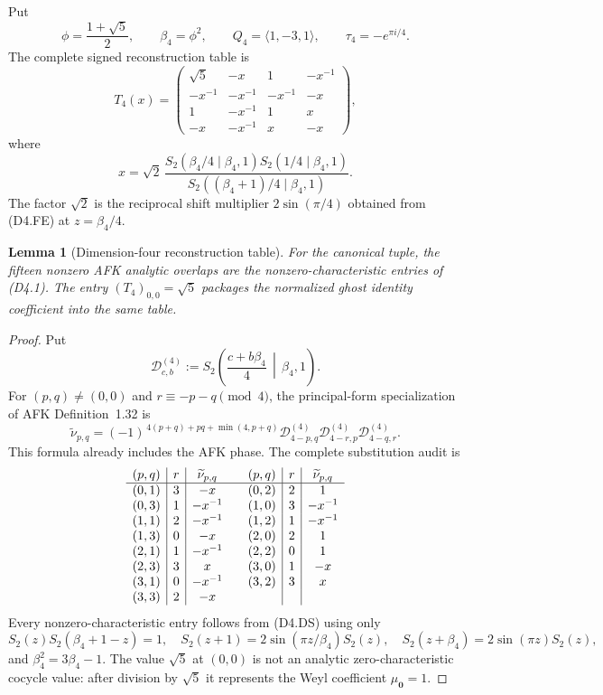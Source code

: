 \documentclass[11pt]{article}
\newtheorem{lemma}[theorem]{Lemma}
\begin{document}
Put
\[
 \phi=\frac{1+\sqrt5}{2},\qquad
 \beta_4=\phi^2,\qquad
 Q_4=\langle1,-3,1\rangle,\qquad
 \tau_4=-e^{\pi i/4}.
\]
The complete signed reconstruction table is
\[
T_4(x)=
\begin{pmatrix}
\sqrt5&-x&1&-x^{-1}\\
-x^{-1}&-x^{-1}&-x^{-1}&-x\\
1&-x^{-1}&1&x\\
-x&-x^{-1}&x&-x
\end{pmatrix},
\tag{D4.1}
\]
where
\[
x=\sqrt2\,
\frac{S_2(\beta_4/4\mid\beta_4,1)
      S_2(1/4\mid\beta_4,1)}
     {S_2((\beta_4+1)/4\mid\beta_4,1)}.
\tag{D4.2}
\]
The factor $\sqrt2$ is the reciprocal shift multiplier
$2\sin(\pi/4)$ obtained from \textup{(D4.FE)} at $z=\beta_4/4$.
\begin{lemma}[Dimension-four reconstruction table]\label{lem:d4overlaps}
For the canonical tuple, the fifteen nonzero AFK analytic overlaps are
the nonzero-characteristic entries of \textup{(D4.1)}.  The entry
$(T_4)_{0,0}=\sqrt5$ packages the normalized ghost identity coefficient
into the same table.
\end{lemma}

\begin{proof}
Put
\[
 \mathcal D^{(4)}_{c,b}:=
 S_2\!\left(\frac{c+b\beta_4}{4}\,\middle|\,\beta_4,1\right).
\]
For $(p,q)\ne(0,0)$ and $r\equiv-p-q\pmod4$, the principal-form
specialization of AFK Definition~1.32 is
\[
 \widetilde\nu_{p,q}
 =(-1)^{\,4(p+q)+pq+\min(4,p+q)}
 \mathcal D^{(4)}_{4-p,q}\mathcal D^{(4)}_{4-r,p}
 \mathcal D^{(4)}_{4-q,r}.
\tag{D4.DS}
\]
This formula already includes the AFK phase.  The complete substitution
audit is
\[
\begin{array}{c|c|c@{\qquad}c|c|c}
(p,q)&r&\widetilde\nu_{p,q}&(p,q)&r&\widetilde\nu_{p,q}\\ \hline
(0,1)&3&-x &(0,2)&2&1\\
(0,3)&1&-x^{-1}&(1,0)&3&-x^{-1}\\
(1,1)&2&-x^{-1}&(1,2)&1&-x^{-1}\\
(1,3)&0&-x&(2,0)&2&1\\
(2,1)&1&-x^{-1}&(2,2)&0&1\\
(2,3)&3&x&(3,0)&1&-x\\
(3,1)&0&-x^{-1}&(3,2)&3&x\\
(3,3)&2&-x&&&
\end{array}
\]
Every nonzero-characteristic entry follows from \textup{(D4.DS)}
using only
\[
 S_2(z)S_2(\beta_4+1-z)=1,\quad
 S_2(z+1)=2\sin(\pi z/\beta_4)S_2(z),\quad
 S_2(z+\beta_4)=2\sin(\pi z)S_2(z),
\tag{D4.FE}
\]
and $\beta_4^2=3\beta_4-1$.  The value $\sqrt5$ at $(0,0)$ is not an
analytic zero-characteristic cocycle value: after division by
$\sqrt5$ it represents the Weyl coefficient $\mu_{\boldsymbol0}=1$.
\end{proof}
\end{document}
